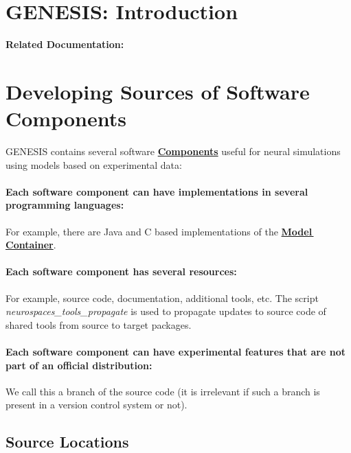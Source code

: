 \documentclass[12pt]{article}
\begin{document}
\section*{GENESIS: Introduction}

{\bf Related Documentation:} \\

\section*{Developing Sources of Software Components}


GENESIS contains several software \href{../reserved-words/reserved-words.tex}{\bf Components} useful for neural simulations using models based on experimental data:
\paragraph{\bf Each software component can have implementations in several programming languages:} For example, there are Java and C based implementations of the \href{../model-container/model-container.tex}{\bf Model\,Container}.
\paragraph{\bf Each software component has several resources:} For example, source code, documentation, additional tools, etc.  The script {\it neurospaces\_tools\_propagate} is used to propagate updates to source code of shared tools from source to target packages.

\paragraph{\bf Each software component can have experimental features that are not part of an official distribution:} We call this a branch of the source code (it is irrelevant if such a branch is present in a version control system or not). 

\subsection*{Source Locations}
\end{document}
